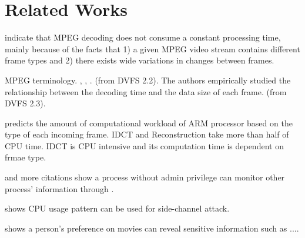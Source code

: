 \section{Related Works}
\label{sec:relatedworks}

\cite{Bavier98predictingmpeg}\cite{DVFS} indicate that MPEG\cite{MPEG} decoding does not consume a constant processing time, mainly because of the facts that 1) a given MPEG video stream contains different frame types and 2) there exists wide variations in changes between frames. 

\cite{MPEG} MPEG terminology. , , . (from DVFS 2.2). 
The authors empirically studied the relationship between the decoding time and the data size of each frame.  (from DVFS 2.3). 

\cite{DVFS}  predicts the amount of computational workload of ARM processor based on the type of each incoming frame.
IDCT and Reconstruction take more than half of CPU time. 
IDCT is CPU intensive and its computation time is dependent on frmae type.



\cite{MEMENTO} and more citations show a process without admin privilege can monitor other process' information through . 

shows CPU usage pattern can be used for side-channel attack. 

shows a person's preference on movies can reveal sensitive information such as ....
